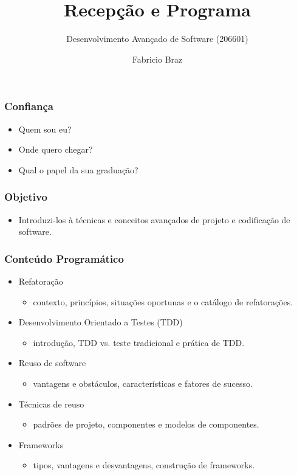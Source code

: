 \documentclass{beamer}
\begin{document}
\subtitle{Desenvolvimento Avançado de Software (206601)}   
\title{Recepção e Programa}
\author{Fabricio Braz} 
\date{} 

\frame{\titlepage} 


	\begin{frame}
		\frametitle{Confiança}
		\begin{itemize}
			\item Quem sou eu?
			\item Onde quero chegar?
			\item Qual o papel da sua graduação?
		\end{itemize}
	\end{frame}

	\begin{frame}
		\frametitle{Objetivo}
		\begin{itemize}
			\item Introduzi-los à técnicas e conceitos avançados de projeto e codificação de software.
		\end{itemize}
	\end{frame}
	
	
		\begin{frame}
		\frametitle{Conteúdo Programático}
			\begin{itemize}
				\item Refatoração
					\begin{itemize}
						\item contexto, princípios, situações oportunas e o catálogo de refatorações.
					\end{itemize}
				\item Desenvolvimento Orientado a Testes (TDD)
					\begin{itemize}
						\item introdução, TDD vs. teste tradicional e prática de TDD.
					\end{itemize}
				\item Reuso de software
					\begin{itemize}
						\item vantagens e obstáculos, características e fatores de sucesso.
					\end{itemize}
				\item Técnicas de reuso
					\begin{itemize}
						\item padrões de projeto, componentes e modelos de componentes.
					\end{itemize}
				\item Frameworks
					\begin{itemize}
						\item tipos, vantagens e desvantagens, construção de frameworks.
					\end{itemize}
		\end{itemize}
	\end{frame}
	
\end{document}
